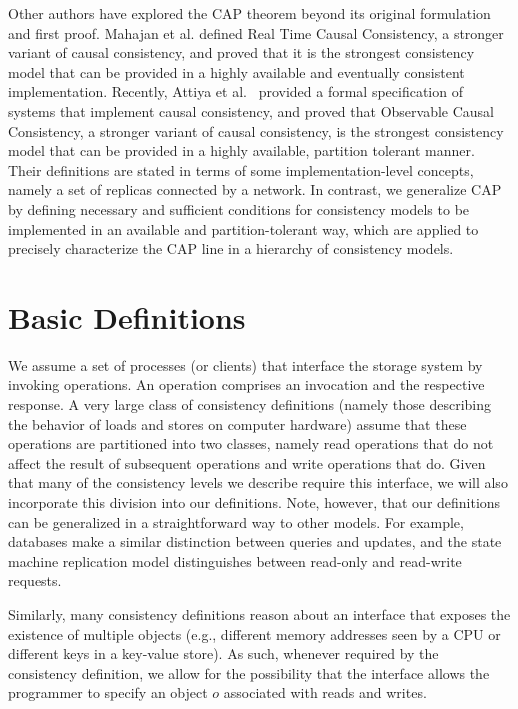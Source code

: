 \documentclass[acmlarge, ,11pt]{acmart}
\begin{document}
Other authors have explored the CAP theorem beyond its original formulation and first proof.
Mahajan et al. \cite{mahajan11cacTR} defined Real Time Causal Consistency, a stronger variant of causal consistency, and proved that it is the strongest consistency model that can be provided in a highly available and eventually consistent implementation.
Recently, Attiya et al.~\cite{Attiya:2015:LHE:2767386.2767419}  provided a formal specification of systems that implement causal consistency, and proved that Observable Causal Consistency, a stronger variant of causal consistency, is the strongest consistency model that can be provided in a highly available, partition tolerant manner. Their definitions are stated in terms of some implementation-level concepts, namely a set of replicas connected by a network.
In contrast, we generalize CAP by defining necessary and sufficient conditions for consistency models to be implemented in an available and partition-tolerant way, which are applied to precisely characterize the CAP line in a hierarchy of consistency models.

  \section{Basic Definitions} \label{sec:definitions}



We assume a set of processes (or clients) that interface the storage system by invoking operations. An operation comprises an invocation and the respective response. A very large class of consistency definitions (namely those describing the behavior of loads and stores on computer hardware) assume that these operations are partitioned into two classes, namely read operations that do not affect the result of subsequent operations and write operations that do. Given that many of the consistency levels we describe require this interface, we will also incorporate this division into our definitions. Note, however, that our definitions can be generalized in a straightforward way to other models. For example, databases make a similar distinction between queries and updates, and the state machine replication model distinguishes between read-only and read-write requests.

Similarly, many consistency definitions reason about an interface that exposes the existence of multiple objects (e.g., different memory addresses seen by a CPU or different keys in a key-value store). As such, whenever required by the consistency definition, we allow for the possibility that the interface allows the programmer to specify an object $o$ associated with reads and writes.
\end{document}
